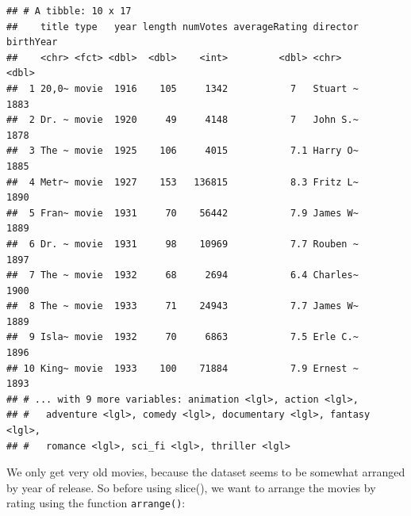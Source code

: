 \documentclass[]{book}
\newenvironment{Shaded}{\begin{snugshade}}{\end{snugshade}}
\newcommand{\DecValTok}[1]{\textcolor[rgb]{0.00,0.00,0.81}{#1}}
\newcommand{\KeywordTok}[1]{\textcolor[rgb]{0.13,0.29,0.53}{\textbf{#1}}}
\newcommand{\NormalTok}[1]{#1}
\newcommand{\OperatorTok}[1]{\textcolor[rgb]{0.81,0.36,0.00}{\textbf{#1}}}
\newcommand{\StringTok}[1]{\textcolor[rgb]{0.31,0.60,0.02}{#1}}
\begin{document}
\begin{verbatim}
## # A tibble: 10 x 17
##    title type   year length numVotes averageRating director birthYear
##    <chr> <fct> <dbl>  <dbl>    <int>         <dbl> <chr>        <dbl>
##  1 20,0~ movie  1916    105     1342           7   Stuart ~      1883
##  2 Dr. ~ movie  1920     49     4148           7   John S.~      1878
##  3 The ~ movie  1925    106     4015           7.1 Harry O~      1885
##  4 Metr~ movie  1927    153   136815           8.3 Fritz L~      1890
##  5 Fran~ movie  1931     70    56442           7.9 James W~      1889
##  6 Dr. ~ movie  1931     98    10969           7.7 Rouben ~      1897
##  7 The ~ movie  1932     68     2694           6.4 Charles~      1900
##  8 The ~ movie  1933     71    24943           7.7 James W~      1889
##  9 Isla~ movie  1932     70     6863           7.5 Erle C.~      1896
## 10 King~ movie  1933    100    71884           7.9 Ernest ~      1893
## # ... with 9 more variables: animation <lgl>, action <lgl>,
## #   adventure <lgl>, comedy <lgl>, documentary <lgl>, fantasy <lgl>,
## #   romance <lgl>, sci_fi <lgl>, thriller <lgl>
\end{verbatim}

We only get very old movies, because the dataset seems to be somewhat arranged by year of release. So before using slice(), we want to arrange the movies by rating using the function \texttt{arrange()}:

\begin{Shaded}
\end{Shaded}
\end{document}
